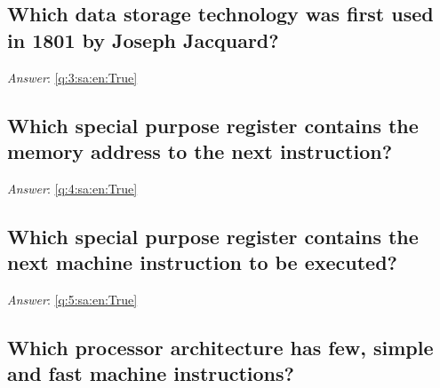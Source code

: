 \documentclass[a4paper,11pt,oneside]{article}
\begin{document}
\begin{sloppypar}
\subsection{Which data storage technology was first used in 1801 by Joseph Jacquard?}

\label{q:3:sa:en:False}

\vspace{2cm}

\noindent\makebox[\textwidth]{\hrulefill}

\vspace{1cm}

\textit{Answer}: \autoref{q:3:sa:en:True}



\subsection{Which special purpose register contains the memory address to the next instruction?}

\label{q:4:sa:en:False}

\vspace{2cm}

\noindent\makebox[\textwidth]{\hrulefill}

\vspace{1cm}

\textit{Answer}: \autoref{q:4:sa:en:True}



\subsection{Which special purpose register contains the next machine instruction to be executed?}

\label{q:5:sa:en:False}

\vspace{2cm}

\noindent\makebox[\textwidth]{\hrulefill}

\vspace{1cm}

\textit{Answer}: \autoref{q:5:sa:en:True}



\subsection{Which processor architecture has few, simple and fast machine instructions?}

\label{q:6:sa:en:False}


\end{sloppypar}
\end{document}
